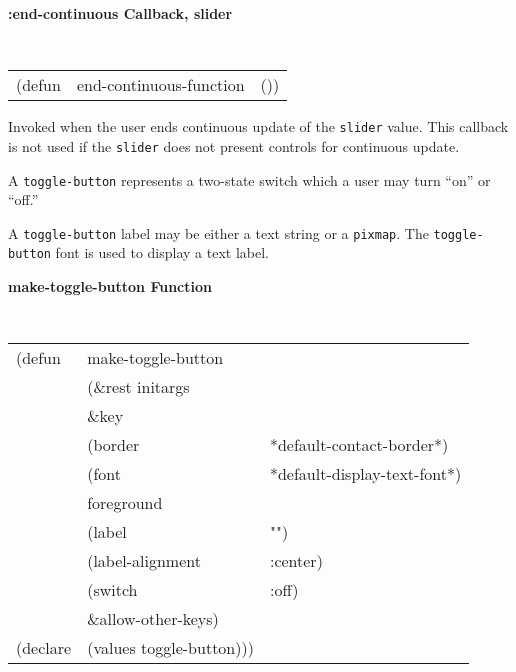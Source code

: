 {\samepage
{\large {\bf :end-continuous \hfill Callback, slider}} 
\begin{flushright} 
\parbox[t]{6.125in}{
\tt
\begin{tabular}{lll}
\raggedright
(defun & end-continuous-function & ())
\end{tabular}
\rm

}\end{flushright}}

\begin{flushright} \parbox[t]{6.125in}{
Invoked when the user ends continuous update of the {\tt slider} value. This
callback is not used if the {\tt slider} does not present controls for
continuous update.

}\end{flushright}


\vfill\pagebreak






A {\tt toggle-button} represents a two-state switch which a user may turn
``on'' or ``off.'' 

A {\tt toggle-button} label may be either a text string or a {\tt pixmap}.
The {\tt toggle-button} font is used to display a text label.


{\samepage
{\large {\bf make-toggle-button \hfill Function}} 
\begin{flushright} \parbox[t]{6.125in}{
\tt
\begin{tabular}{lll}
\raggedright
(defun & make-toggle-button \\
       & (\&rest initargs \\
       & \&key  \\
       & (border                & *default-contact-border*) \\ 
       & (font                  & *default-display-text-font*) \\ 
       & foreground \\
       & (label                 & "") \\  
       & (label-alignment       & :center) \\  
       & (switch                & :off) \\  
       &   \&allow-other-keys) \\
(declare & (values   toggle-button)))
\end{tabular}
\rm

}\end{flushright}}

